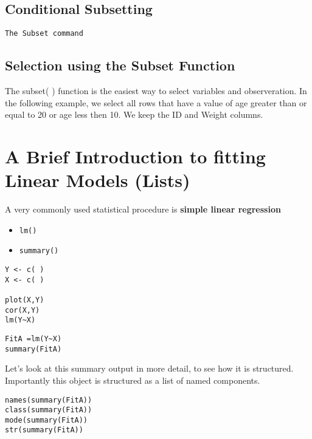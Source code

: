 \documentclass[a4paper,12pt]{article}
\begin{document}
\subsection{Conditional Subsetting}
 \texttt{The Subset command}
\subsection{Selection using the Subset Function}
The subset( ) function is the easiest way to select variables and observeration. In the following example, we select all rows that have a value of age greater than or equal to 20 or age less then 10. We keep the ID and Weight columns.





\section{A Brief Introduction to fitting Linear Models (Lists)}

A very commonly used statistical procedure is \textbf{simple linear regression}
\begin{itemize}
\item \texttt{lm()}
\item \texttt{summary()}
\end{itemize}

\begin{framed}
\begin{verbatim}
Y <- c( )
X <- c( )

plot(X,Y)
cor(X,Y)
lm(Y~X)
\end{verbatim}
\end{framed}
\begin{framed}
\begin{verbatim}
FitA =lm(Y~X)
summary(FitA)
\end{verbatim}
\end{framed}
Let's look at this summary output in more detail, to see how it is structured. Importantly this object is structured as a list of named components.
\begin{framed}
\begin{verbatim}
names(summary(FitA))
class(summary(FitA))
mode(summary(FitA))
str(summary(FitA))
\end{verbatim}
\end{framed}
\end{document}
